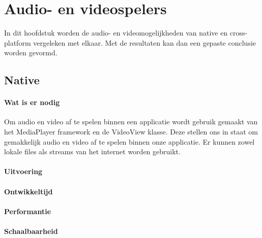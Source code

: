 
\chapter{Audio- en videospelers}%
\label{ch:audioenvideo}

In dit hoofdstuk worden de audio- en videomogelijkheden van native en cross-platform vergeleken met elkaar. 
Met de resultaten kan dan een gepaste conclusie worden gevormd.

\section{Native}
\subsubsection{Wat is er nodig}
Om audio en video af te spelen binnen een applicatie wordt gebruik gemaakt van het MediaPlayer 
framework en de VideoView klasse. Deze stellen ons in staat om gemakkelijk audio en video af te spelen binnen 
onze applicatie. Er kunnen zowel lokale files als streams van het internet worden gebruikt.

\subsubsection{Uitvoering}



\subsubsection{Ontwikkeltijd}



\subsubsection{Performantie}



\subsubsection{Schaalbaarheid}




